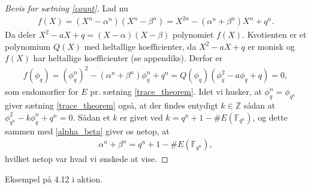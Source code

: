 \begin{proof}[Bevis for sætning \ref{count}]
Lad nu 
\begin{align*}
	f(X) = (X^n - \alpha^n)(X^n - \beta^n) = X^{2n} - (\alpha^n + \beta^n)X^n + q^n.
\end{align*}
Da deler $X^2 - aX + q = (X- \alpha)(X-\beta)$ polynomiet $f(X)$. Kvotienten er et polynomium $Q(X)$ med heltallige koefficienter, da $X^2 - aX + q$ er monisk og $f(X)$ har heltallige koefficienter (se appendiks). Derfor er
\begin{align}
	\label{alpha_beta}
	f(\phi_q) = (\phi_{q}^{n})^2 - (\alpha^n + \beta^n) \phi_{q}^{n} + q^n
	= Q(\phi_q)(\phi_{q}^{2} - a \phi_q + q) = 0,
\end{align}
som endomorfier for $E$ pr. sætning \ref{trace_theorem}. Idet vi husker, at $\phi_{q}^{n} = \phi_{q^n}$ giver sætning \ref{trace_theorem} også, at der findes entydigt $k \in \mathbb{Z}$ sådan at $\phi_{q^n}^{2} - k \phi_{q}^{n} + q^n = 0$. Sådan et $k$ er givet ved $k=q^n + 1 - \#E(\mathbb{F}_{q^n})$, og dette sammen med \eqref{alpha_beta} giver os netop, at
\begin{align*}
	\alpha^n + \beta^n = q^n + 1 - \#E(\mathbb{F}_{q^n}),
\end{align*}
hvilket netop var hvad  vi ønskede at vise.
\end{proof}

\begin{example}
Eksempel på 4.12 i aktion.
\end{example}




